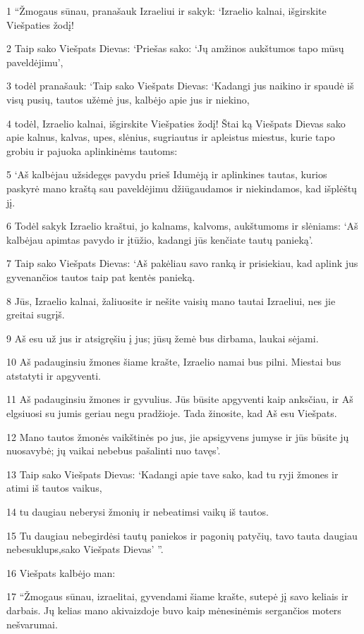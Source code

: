 \par 1 “Žmogaus sūnau, pranašauk Izraeliui ir sakyk: ‘Izraelio kalnai, išgirskite Viešpaties žodį! 
\par 2 Taip sako Viešpats Dievas: ‘Priešas sako: ‘Jų amžinos aukštumos tapo mūsų paveldėjimu’, 
\par 3 todėl pranašauk: ‘Taip sako Viešpats Dievas: ‘Kadangi jus naikino ir spaudė iš visų pusių, tautos užėmė jus, kalbėjo apie jus ir niekino, 
\par 4 todėl, Izraelio kalnai, išgirskite Viešpaties žodį! Štai ką Viešpats Dievas sako apie kalnus, kalvas, upes, slėnius, sugriautus ir apleistus miestus, kurie tapo grobiu ir pajuoka aplinkinėms tautoms: 
\par 5 ‘Aš kalbėjau užsidegęs pavydu prieš Idumėją ir aplinkines tautas, kurios paskyrė mano kraštą sau paveldėjimu džiūgaudamos ir niekindamos, kad išplėštų jį. 
\par 6 Todėl sakyk Izraelio kraštui, jo kalnams, kalvoms, aukštumoms ir slėniams: ‘Aš kalbėjau apimtas pavydo ir įtūžio, kadangi jūs kenčiate tautų panieką’. 
\par 7 Taip sako Viešpats Dievas: ‘Aš pakėliau savo ranką ir prisiekiau, kad aplink jus gyvenančios tautos taip pat kentės panieką. 
\par 8 Jūs, Izraelio kalnai, žaliuosite ir nešite vaisių mano tautai Izraeliui, nes jie greitai sugrįš. 
\par 9 Aš esu už jus ir atsigręšiu į jus; jūsų žemė bus dirbama, laukai sėjami. 
\par 10 Aš padauginsiu žmones šiame krašte, Izraelio namai bus pilni. Miestai bus atstatyti ir apgyventi. 
\par 11 Aš padauginsiu žmones ir gyvulius. Jūs būsite apgyventi kaip anksčiau, ir Aš elgsiuosi su jumis geriau negu pradžioje. Tada žinosite, kad Aš esu Viešpats. 
\par 12 Mano tautos žmonės vaikštinės po jus, jie apsigyvens jumyse ir jūs būsite jų nuosavybė; jų vaikai nebebus pašalinti nuo tavęs’. 
\par 13 Taip sako Viešpats Dievas: ‘Kadangi apie tave sako, kad tu ryji žmones ir atimi iš tautos vaikus, 
\par 14 tu daugiau neberysi žmonių ir nebeatimsi vaikų iš tautos. 
\par 15 Tu daugiau nebegirdėsi tautų paniekos ir pagonių patyčių, tavo tauta daugiau nebesuklups,­sako Viešpats Dievas’ ”. 
\par 16 Viešpats kalbėjo man: 
\par 17 “Žmogaus sūnau, izraelitai, gyvendami šiame krašte, sutepė jį savo keliais ir darbais. Jų kelias mano akivaizdoje buvo kaip mėnesinėmis sergančios moters nešvarumai. 
